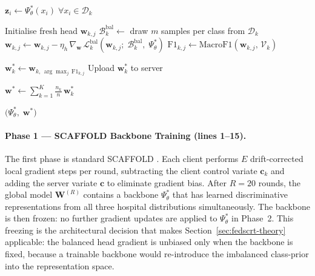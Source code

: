 \begin{algorithm}[htbp]
\begin{algorithmic}[1]

  \State $\mathbf{z}_i \leftarrow \Psi^*_\theta(x_i)\;
         \forall x_i \in \mathcal{D}_k$

    \State Initialise fresh head $\mathbf{w}_{k,j}$
      \State $\mathcal{B}_k^{\mathrm{bal}} \leftarrow$
             draw $m$ samples per class from $\mathcal{D}_k$
      \State $\mathbf{w}_{k,j} \leftarrow
             \mathbf{w}_{k,j}
             - \eta_h\,
             \nabla_{\!\mathbf{w}}\,
             \mathcal{L}_k^{\mathrm{bal}}
             \!\left(\mathbf{w}_{k,j};\;
             \mathcal{B}_k^{\mathrm{bal}},\;
             \Psi^*_\theta\right)$
    \EndFor
    \State $\mathrm{F1}_{k,j} \leftarrow
           \mathrm{MacroF1}
           \!\left(\mathbf{w}_{k,j},\,\mathcal{V}_k\right)$
  \EndFor

  \State $\mathbf{w}_k^* \leftarrow
         \mathbf{w}_{k,\,\arg\max_{j}\,\mathrm{F1}_{k,j}}$
  \State Upload $\mathbf{w}_k^*$ to server
\EndFor

\State $\mathbf{w}^* \leftarrow
       \displaystyle\sum_{k=1}^K
       \frac{n_k}{n}\,\mathbf{w}_k^*$

\State \Return $\bigl(\Psi^*_\theta,\; \mathbf{w}^*\bigr)$
\end{algorithmic}
\end{algorithm}

\paragraph{Phase 1 --- SCAFFOLD Backbone Training (lines 1--15).}
The first phase is standard SCAFFOLD
\cite{karimireddy2020scaffold}.
Each client performs $E$ drift-corrected local gradient
steps per round, subtracting the client control variate
$\mathbf{c}_k$ and adding the server variate $\mathbf{c}$
to eliminate gradient bias.
After $R = 20$ rounds, the global model
$\mathbf{W}^{(R)}$ contains a backbone
$\Psi^*_\theta$ that has learned discriminative
representations from all three hospital distributions
simultaneously.
The backbone is then frozen: no further gradient updates
are applied to $\Psi^*_\theta$ in Phase~2.
This freezing is the architectural decision that makes
Section~\ref{sec:fedscrt-theory} applicable: the balanced head
gradient is unbiased only when the backbone is fixed,
because a trainable backbone would re-introduce the
imbalanced class-prior into the representation space.

